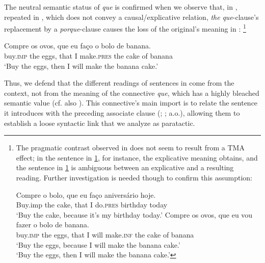 \documentclass[output=paper,colorlinks,citecolor=brown,
]{langscibook}
\begin{document}
The neutral semantic status of \textit{que} is confirmed when we observe that, in , repeated in , which does not convey a causal/explicative relation, \textit{the} \textit{que}-clause’s replacement by a \textit{porque}-clause  causes the loss of the original’s meaning in :
\footnote{The pragmatic contrast observed in  does not seem to result from a TMA effect; in the sentence in \ref{ex:matos:fn2-i}, for instance, the explicative meaning obtains, and the sentence in \ref{ex:matos:fn2-ii} is ambiguous between an explicative and a resulting reading. Further investigation is needed though to confirm this assumption:

\ea 
 \ea\label{ex:matos:fn2-i}
 \gll Compre o bolo, que eu faço aniversário hoje.\\
      Buy.\textsc{}{imp} the cake, that I do.\textsc{pres} birthday today\\
 \glt ‘Buy the cake, because it’s my birthday today.’
 \ex\label{ex:matos:fn2-ii}
 \gll Compre os ovos, que eu vou fazer o bolo de                        banana.\\
      buy.\textsc{imp} the eggs, that I will make.\textsc{inf} the cake of banana\\
 \glt ‘Buy the eggs, because I will make the banana         cake.’\\ 
      ‘Buy the eggs, then I will make the banana cake.’
\z\z}

\ea \label{ex:matos:ovos3}
 \ea \label{ex:matos:ovos3-que}
 \gll Compre os ovos, que eu faço o bolo de banana.\\
	    buy.\textsc{imp} the eggs, that I make.\textsc{pres} the cake of banana\\
 \glt ‘Buy the eggs, then I will make the banana cake.’ 
 \label{ex:matos:ovos3-porque}
 \z
 \z
 
Thus, we defend that the different readings of sentences in  come from the context, not from the meaning of the connective \textit{que}, which has a highly bleached semantic value (cf. also \citealt{corr_ibero-romance_2016}). This connective’s main import is to relate the sentence it introduces with the preceding associate clause (\citealt{corr_ibero-romance_2016}; \citealt{etxepare_coordination_2014}; a.o.), allowing them to establish a loose syntactic link that we analyze as paratactic.
\end{document}
